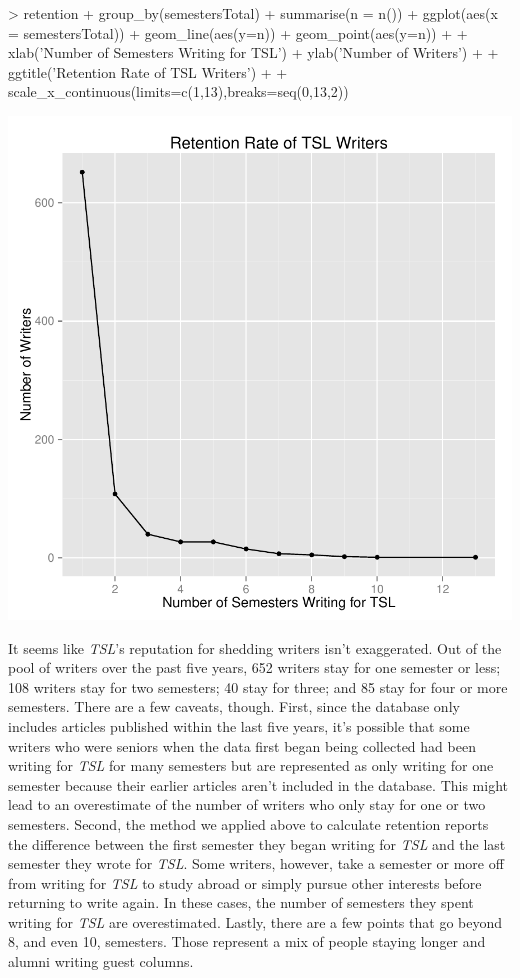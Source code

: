 \documentclass[a4paper]{article}
\begin{document}
\begin{Schunk}
\begin{Sinput}
> retention %
+   group_by(semestersTotal) %
+   summarise(n = n()) %
+   ggplot(aes(x = semestersTotal)) + geom_line(aes(y=n)) + geom_point(aes(y=n)) +
+   xlab('Number of Semesters Writing for TSL') + ylab('Number of Writers') +
+   ggtitle('Retention Rate of TSL Writers') +
+   scale_x_continuous(limits=c(1,13),breaks=seq(0,13,2))
\end{Sinput}
\end{Schunk}
\includegraphics{FinalProject-015}

It seems like \textit{TSL}'s reputation for shedding writers isn't exaggerated. Out of the pool of writers over the past five years, 652 writers stay for one semester or less; 108 writers stay for two semesters; 40 stay for three; and 85 stay for four or more semesters. There are a few caveats, though. First, since the database only includes articles published within the last five years, it's possible that some writers who were seniors when the data first began being collected had been writing for \textit{TSL} for many semesters but are represented as only writing for one semester because their earlier articles aren't included in the database. This might lead to an overestimate of the number of writers who only stay for one or two semesters. Second, the method we applied above to calculate retention reports the difference between the first semester they began writing for \textit{TSL} and the last semester they wrote for \textit{TSL}. Some writers, however, take a semester or more off from writing for \textit{TSL} to study abroad or simply pursue other interests before returning to write again. In these cases, the number of semesters they spent writing for \textit{TSL} are overestimated. Lastly, there are a few points that go beyond 8, and even 10, semesters. Those represent a mix of people staying longer and alumni writing guest columns.
\end{document}
